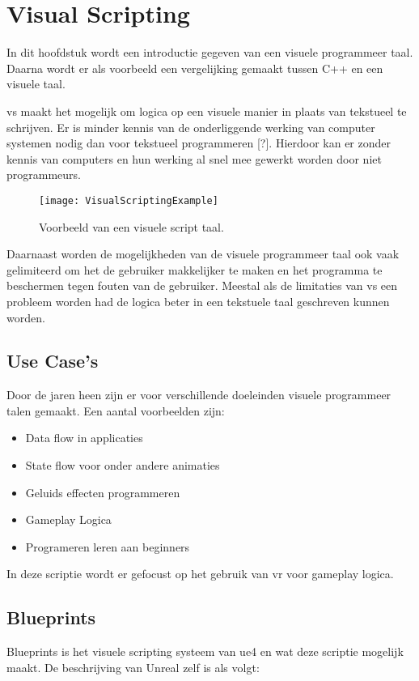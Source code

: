 \lstset {language=C++}

\chapter{Visual Scripting}
\label{ch:visualscripting}
In dit hoofdstuk wordt een introductie gegeven van een visuele programmeer taal. Daarna wordt er als voorbeeld een vergelijking gemaakt tussen C++ en een visuele taal.

\gls{vs} maakt het mogelijk om logica op een visuele manier in plaats van tekstueel te schrijven. Er is minder kennis van de onderliggende werking van computer systemen nodig dan voor tekstueel programmeren [?]. Hierdoor kan er zonder kennis van computers en hun werking al snel mee gewerkt worden door niet programmeurs. 

\begin{figure}[!ht]
  \centering
    \texttt{[image: VisualScriptingExample]}
    \caption{Voorbeeld van een visuele script taal.}
\end{figure}

Daarnaast worden de mogelijkheden van de visuele programmeer taal ook vaak gelimiteerd om het de gebruiker makkelijker te maken en het programma te beschermen tegen fouten van de gebruiker. Meestal als de limitaties van \gls{vs} een probleem worden had de logica beter in een tekstuele taal geschreven kunnen worden.

\section{Use Case's}
Door de jaren heen zijn er voor verschillende doeleinden visuele programmeer talen gemaakt. 
Een aantal voorbeelden zijn:

\begin{itemize}  
\item Data flow in applicaties 
\item State flow voor onder andere animaties 
\item Geluids effecten programmeren
\item Gameplay Logica 
\item Programeren leren aan beginners 
\end{itemize}

In deze scriptie wordt er gefocust op het gebruik van \gls{vr} voor gameplay logica.

\section{Blueprints}
Blueprints is het visuele scripting systeem van \gls{ue4} en wat deze scriptie mogelijk maakt. De beschrijving van Unreal zelf is als volgt:

